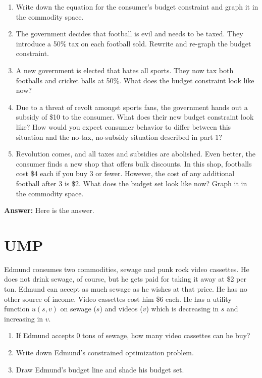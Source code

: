 \documentclass[12pt,a4paper]{article}
\begin{document}
\begin{enumerate}
  \item Write down the equation for the consumer's budget constraint and graph it in the commodity space.
  \item The government decides that football is evil and needs to be taxed. They introduce a 50\% tax on each football sold. Rewrite and re-graph the budget constraint.
  \item A new government is elected that hates all sports. They now tax both footballs and cricket balls at 50\%. What does the budget constraint look like now?
  \item Due to a threat of revolt amongst sports fans, the government hands out a subsidy of \$10 to the consumer. What does their new budget constraint look like? How would you expect consumer behavior to differ between this situation and the no-tax, no-subsidy situation described in part 1?
  \item Revolution comes, and all taxes and subsidies are abolished. Even better, the consumer finds a new shop that offers bulk discounts. In this shop, footballs cost \$4 each if you buy 3 or fewer. However, the cost of any additional football after 3 is \$2. What does the budget set look like now? Graph it in the commodity space.
\end{enumerate}

\vspace{0.5cm}

\noindent\textbf{Answer:} Here is the answer.

\section{UMP}
Edmund consumes two commodities, sewage and punk rock video cassettes. He does not drink sewage, of course, but he gets paid for taking it away at \$2 per ton. Edmund can accept as much sewage as he wishes at that price. He has no other source of income. Video cassettes cost him \$6 each. He has a utility function $u(s,v)$ on sewage ($s$) and videos ($v$) which is decreasing in $s$ and increasing in $v$.

\begin{enumerate}
  \item If Edmund accepts 0 tons of sewage, how many video cassettes can he buy?
  \item Write down Edmund's constrained optimization problem.
  \item Draw Edmund's budget line and shade his budget set.
\end{enumerate}
\end{document}
